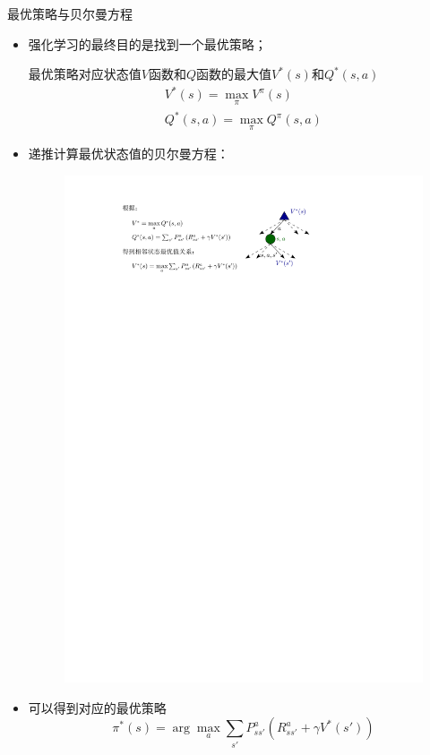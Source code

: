 \begin{note}
    最优策略与贝尔曼方程
    \begin{itemize}
        \item 强化学习的最终目的是找到一个最优策略；

        最优策略对应状态值$V$函数和$Q$函数的最大值$V^{*}(s)$和$Q^{*}(s,a)$
        \[
            \begin{array}{l}
                V^{*}(s) = \max\limits_{\pi} V^{\pi}(s)\\
                Q^{*}(s,a) = \max\limits_{\pi}Q^{\pi}(s,a)
            \end{array}
        \]
        \item 递推计算最优状态值的贝尔曼方程：
        \begin{figure}[htbp]
            \centering
            \includegraphics{image/贝尔曼方程.pdf}
        \end{figure}
        \item 可以得到对应的最优策略
        \[
            \pi^{*}(s) = \arg\max\limits_{a}\sum\limits_{s'}P_{ss'}^{a}\left( R_{ss'}^{a}+\gamma V^{*}(s') \right)
        \]
    \end{itemize}

\end{note}
